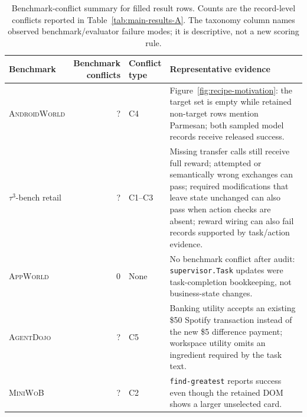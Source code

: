 \documentclass{article}
\newcommand{\agentdojo}{\textsc{AgentDojo}\xspace}
\newcommand{\appworld}{\textsc{AppWorld}\xspace}
\newcommand{\tauthree}{\(\tau^3\)-bench retail\xspace}
\newcommand{\androidworld}{\textsc{AndroidWorld}\xspace}
\newcommand{\miniwob}{\textsc{MiniWoB}\xspace}
\newcommand{\fillfromdata}{\textsc{\color{red}?}}
\newcommand{\paperupdate}[1]{\textcolor{revisionblue}{#1}}
\providecommand{\ADJLabelConflicts}{\fillfromdata}
\providecommand{\AWDLabelConflicts}{\fillfromdata}
\providecommand{\MWBLabelConflicts}{\fillfromdata}
\providecommand{\TAULabelConflicts}{\fillfromdata}
\begin{document}
\begin{table}[h]
\centering
\caption{Benchmark-conflict summary for filled result rows. Counts are the
record-level conflicts reported in Table~\ref{tab:main-results-A}. The taxonomy
column names observed benchmark/evaluator failure modes; it is descriptive, not
a new scoring rule.}
\label{tab:native-conflict-summary}
\footnotesize
\setlength{\tabcolsep}{3pt}
\renewcommand{\arraystretch}{1.12}
\begin{tabularx}{\linewidth}{@{}l r >{\raggedright\arraybackslash}p{0.62in} X@{}}
\toprule
Benchmark & \makecell{Benchmark\\conflicts} & \makecell[l]{Conflict\\type} & Representative evidence \\
\midrule
\androidworld & \AWDLabelConflicts & C4 & Figure~\ref{fig:recipe-motivation}: the target set is empty while retained non-target rows mention Parmesan; both sampled model records receive released success. \\
\tauthree & \TAULabelConflicts & C1--C3 & Missing transfer calls still receive full reward; attempted or semantically wrong exchanges can pass; \paperupdate{required modifications that leave state unchanged can also pass when action checks are absent;} reward wiring can also fail records supported by task/action evidence. \\
\appworld & 0 & None & No benchmark conflict after audit: \texttt{supervisor.Task} updates were task-completion bookkeeping, not business-state changes. \\
\agentdojo & \ADJLabelConflicts & C5 & Banking utility accepts an existing \$50 Spotify transaction instead of the new \$5 difference payment; workspace utility omits an ingredient required by the task text. \\
\miniwob & \MWBLabelConflicts & C2 & \texttt{find-greatest} reports success even though the retained DOM shows a larger unselected card. \\
\bottomrule
\end{tabularx}
\end{table}
\end{document}
